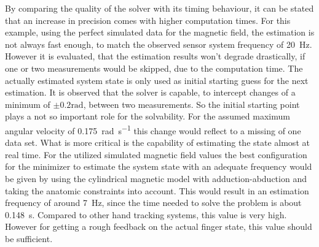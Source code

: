 By comparing the quality of the solver with its timing behaviour, it can be stated that an increase in precision comes with higher computation times. For this example, using the perfect simulated data for the magnetic field, the estimation is not always fast enough, to match the observed sensor system frequency of \SI{20}{\Hz}. However it is evaluated, that the estimation results won't degrade drastically, if one or two measurements would be skipped, due to the computation time. The actually estimated system state is only used as initial starting guess for the next estimation. It is observed that the solver is capable, to intercept changes of a minimum of $ \pm 0.2 \si{\radian} $, between two measurements. So the initial starting point plays a not so important role for the solvability. For the assumed maximum angular velocity of \SI[per-mode=symbol]{0.175}{\radian \per \second} this change would reflect to a missing of one data set. What is more critical is the capability of estimating the state almost at real time. For the utilized simulated magnetic field values the best configuration for the minimizer to estimate the system state with an adequate frequency would be given by using the cylindrical magnetic model with adduction-abduction and taking the anatomic constraints into account. This would result in an estimation frequency of around \SI{7}{\Hz}, since the time needed to solve the problem is about \SI{0.148}{\second}. Compared to other hand tracking systems, this value is very high. However for getting a rough feedback on the actual finger state, this value should be sufficient.
